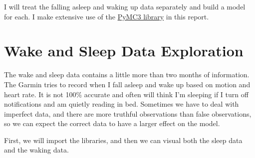 \documentclass[12pt]{article}
\begin{document}
I will treat the falling asleep and waking up data separately and build
a model for each. I make extensive use of the
\href{https://github.com/pymc-devs/pymc3}{PyMC3 library} in this report.

    \section{Wake and Sleep Data
Exploration}\label{wake-and-sleep-data-exploration}

The wake and sleep data contains a little more than two months of
information. The Garmin tries to record when I fall asleep and wake up
based on motion and heart rate. It is not 100\% accurate and often will
think I'm sleeping if I turn off notifications and am quietly reading in
bed. Sometimes we have to deal with imperfect data, and there are more
truthful observations than false observations, so we can expect the
correct data to have a larger effect on the model.

First, we will import the libraries, and then we can visual both the
sleep data and the waking data.
\end{document}
